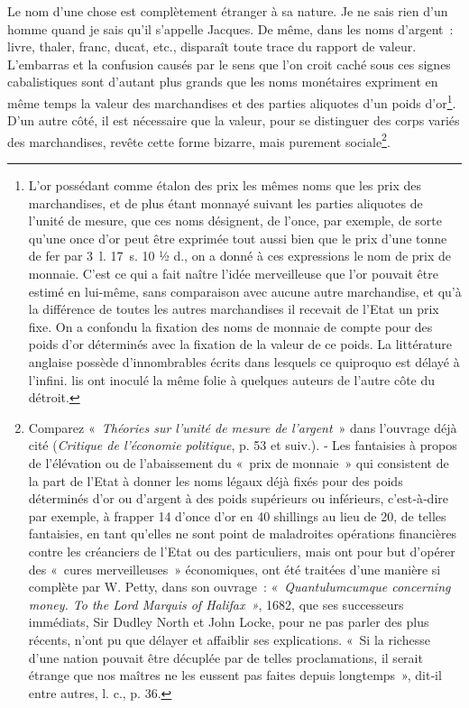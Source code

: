 \documentclass[french,twoside]{book} %
\begin{document}
Le nom d’une chose est complètement étranger à sa nature. Je ne sais rien d’un homme quand je sais qu’il s’appelle Jacques. De même, dans les noms d’argent : livre, thaler, franc, ducat, etc., disparaît toute trace du rapport de valeur. L’embarras et la confusion causés par le sens que l’on croit caché sous ces signes cabalistiques sont d’autant plus grands que les noms monétaires expriment en même temps la valeur des marchandises et des parties aliquotes d’un poids d’or\footnote{L’or possédant comme étalon des prix les mêmes noms que les prix des marchandises, et de plus étant monnayé suivant les parties aliquotes de l’unité de mesure, que ces noms désignent, de l’once, par exemple, de sorte qu’une once d’or peut être exprimée tout aussi bien que le prix d’une tonne de fer par 3 l. 17 s. 10 ½ d., on a donné à ces expressions le nom de prix de monnaie. C’est ce qui a fait naître l’idée merveilleuse que l’or pouvait être estimé en lui-même, sans comparaison avec aucune autre marchandise, et qu’à la différence de toutes les autres marchandises il recevait de l’Etat un prix fixe. On a confondu la fixation des noms de monnaie de compte pour des poids d’or déterminés avec la fixation de la valeur de ce poids. La littérature anglaise possède d’innombrables écrits dans lesquels ce quiproquo est délayé à l’infini. lis ont inoculé la même folie à quelques auteurs de l’autre côte du détroit.}. D’un autre côté, il est nécessaire que la valeur, pour se distinguer des corps variés des marchandises, revête cette forme bizarre, mais purement sociale\footnote{Comparez « \emph{Théories sur l’unité de mesure de l’argent} » dans l’ouvrage déjà cité (\emph{Critique de l’économie politique}, p. 53 et suiv.). ‑ Les fantaisies à propos de l’élévation ou de l’abaissement du « prix de monnaie » qui consistent de la part de l’Etat à donner les noms légaux déjà fixés pour des poids déterminés d’or ou d’argent à des poids supérieurs ou inférieurs, c’est‑à‑dire par exemple, à frapper 14 d’once d’or en 40 shillings au lieu de 20, de telles fantaisies, en tant qu’elles ne sont point de maladroites opérations financières contre les créanciers de l’Etat ou des particuliers, mais ont pour but d’opérer des « cures merveilleuses » économiques, ont été traitées d’une manière si complète par W. Petty, dans son ouvrage : « \emph{Quantulumcumque concerning money. To the Lord Marquis of Halifax »}, 1682, que ses successeurs immédiats, Sir Dudley North et John Locke, pour ne pas parler des plus récents, n’ont pu que délayer et affaiblir ses explications. « Si la richesse d’une nation pouvait être décuplée par de telles proclamations, il serait étrange que nos maîtres ne les eussent pas faites depuis longtemps », dit‑il entre autres, l. c., p. 36.}.\par
\end{document}
